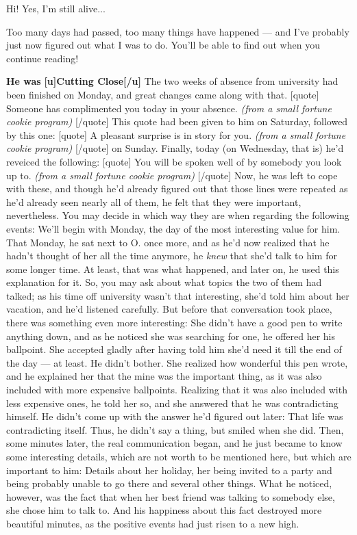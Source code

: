 Hi! Yes, I'm still alive...

Too many days had passed, too many things have happened --- and I've probably just now figured out what I was to do. You'll be able to find out when you continue reading!

\textbf{He was}
\textbf{[u]Cutting Close[/u]}
The two weeks of absence from university had been finished on Monday, and great changes came along with that. 
[quote]
Someone has complimented you today in your absence. 
\emph{(from a small fortune cookie program)}
[/quote]
This quote had been given to him on Saturday, followed by this one: 
[quote]
A pleasant surprise is in story for you. 
\emph{(from a small fortune cookie program)}
[/quote]
on Sunday. Finally, today (on Wednesday, that is) he'd reveiced the following: 
[quote]
You will be spoken well of by somebody you look up to. 
\emph{(from a small fortune cookie program)}
[/quote]
Now, he was left to cope with these, and though he'd already figured out that those lines were repeated as he'd already seen nearly all of them, he felt that they were important, nevertheless. You may decide in which way they are when regarding the following events: 
We'll begin with Monday, the day of the most interesting value for him. That Monday, he sat next to O. once more, and as he'd now realized that he hadn't thought of her all the time anymore, he \emph{knew} that she'd talk to him for some longer time. At least, that was what happened, and later on, he used this explanation for it. So, you may ask about what topics the two of them had talked; as his time off university wasn't that interesting, she'd told him about her vacation, and he'd listened carefully. But before that conversation took place, there was something even more interesting: She didn't have a good pen to write anything down, and as he noticed she was searching for one, he offered her his ballpoint. She accepted gladly after having told him she'd need it till the end of the day --- at least. 
He didn't bother. 
She realized how wonderful this pen wrote, and he explained her that the mine was the important thing, as it was also included with more expensive ballpoints. Realizing that it was also included with less expensive ones, he told her so, and she answered that he was contradicting himself. He didn't come up with the answer he'd figured out later: That life was contradicting itself. Thus, he didn't say a thing, but smiled when she did. 
Then, some minutes later, the real communication began, and he just became to know some interesting details, which are not worth to be mentioned here, but which are important to him: Details about her holiday, her being invited to a party and being probably unable to go there and several other things. What he noticed, however, was the fact that when her best friend was talking to somebody else, she chose him to talk to. And his happiness about this fact destroyed more beautiful minutes, as the positive events had just risen to a new high. 
